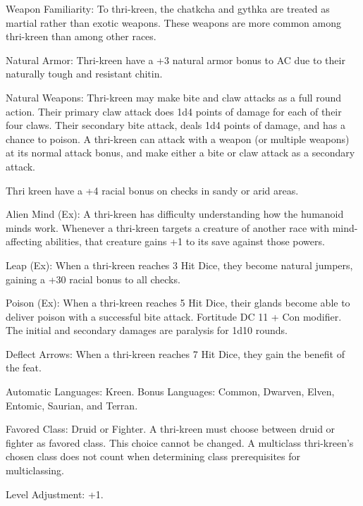\begin{itemize*}
    \item Weapon Familiarity: To thri-kreen, the chatkcha and gythka are treated as martial rather than exotic weapons. These weapons are more common among thri-kreen than among other races.
    \item Natural Armor: Thri-kreen have a +3 natural armor bonus to AC due to their naturally tough and resistant chitin.
    \item Natural Weapons: Thri-kreen may make bite and claw attacks as a full round action. Their primary claw attack does 1d4 points of damage for each of their four claws. Their secondary bite attack, deals 1d4 points of damage, and has a chance to poison. A thri-kreen can attack with a weapon (or multiple weapons) at its normal attack bonus, and make either a bite or claw attack as a secondary attack.

    \item Thri kreen have a +4 racial bonus on  checks in sandy or arid areas.

    \item Alien Mind (Ex): A thri-kreen has difficulty understanding how the humanoid minds work. Whenever a thri-kreen targets a creature of another race with mind-affecting abilities, that creature gains +1 to its save against those powers.
    \item Leap (Ex): When a thri-kreen reaches 3 Hit Dice, they become natural jumpers, gaining a +30 racial bonus to all  checks.
    \item Poison (Ex): When a thri-kreen reaches 5 Hit Dice, their glands become able to deliver poison with a successful bite attack. Fortitude DC 11 + Con modifier. The initial and secondary damages are paralysis for 1d10 rounds.
    \item Deflect Arrows: When a thri-kreen reaches 7 Hit Dice, they gain the benefit of the  feat.

    \item Automatic Languages: Kreen. Bonus Languages: Common, Dwarven, Elven, Entomic, Saurian, and Terran.
    \item Favored Class: Druid or Fighter. A thri-kreen must choose between druid or fighter as favored class. This choice cannot be changed. A multiclass thri-kreen's chosen class does not count when determining class prerequisites for multiclassing.
    \item Level Adjustment: +1.
\end{itemize*}
